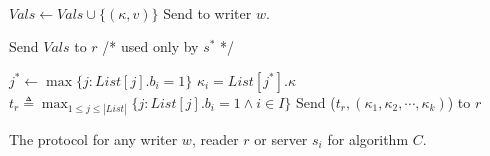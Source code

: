 \begin{algorithm*}[!ht]
\begin{algorithmic}[2]
\vspace{-1.7em}
\\\hrulefill
\vspace{-1.5em}
      \begin{multicols}{3}{\footnotesize
            \EndPart
            \Statex
             {
                       \State   $Vals \gets   Vals \cup \{({\kappa}, v)\}$ 
              \State  Send {\ackTag} to writer $w$.
            }\EndPart
            \Statex
            \EndPart
                   
                        \Statex
             {
              \State   Send $Vals$  to  $r$
            }\EndPart 
          \Statex\Statex   /* used only by $s^*$ */
          
           {
                     \State $j^* \leftarrow \max \{ j : List[j].b_i =1 \}$
                     \State ${\kappa}_i = List[j^*].{\kappa}$
           \EndFor 
             \State  $t_r \triangleq \max_{1 \leq j \leq |List|} \{ j : List[j].b_i = 1 \wedge i \in I\}$ 
            \State  Send  ($t_r, ({\kappa}_1,{\kappa}_2, \cdots, {\kappa}_k)$) to $r$
            }\EndPart       
          }\end{multicols}
        \end{algorithmic} 
        \caption{The protocol for any  writer $w$, reader $r$ or server $s_i$ for  algorithm $C$.}\label{fig:algo_c}
      \end{algorithm*}

